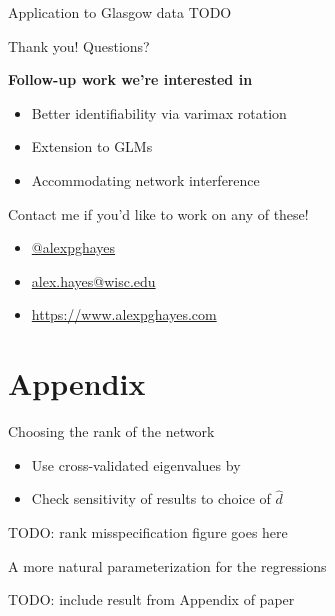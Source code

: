 \documentclass{beamer}
\theoremstyle{remark}
\begin{document}
\begin{frame}{Application to Glasgow data}
    TODO
\end{frame}

\begin{frame}{Thank you! Questions?}

    \textbf{Follow-up work we're interested in}

    \begin{itemize}
        \item Better identifiability via varimax rotation
        \item Extension to GLMs
        \item Accommodating network interference
    \end{itemize}

    Contact me if you'd like to work on any of these!

    \begin{itemize}
        \item[]  \href{https://twitter.com/alexpghayes}{@alexpghayes}
        \item[]  \href{mailto:alex.hayes@wisc.edu}{alex.hayes@wisc.edu}
        \item[]  \url{https://www.alexpghayes.com}
    \end{itemize}

\end{frame}


\section{Appendix}

\begin{frame}{Choosing the rank of the network}

    \begin{itemize}
        \item Use cross-validated eigenvalues by \cite{chen_estimating_2021}
        \item Check sensitivity of results to choice of $\widehat{d}$
    \end{itemize}

    TODO: rank misspecification figure goes here

\end{frame}

\begin{frame}{A more natural parameterization for the regressions}

    TODO: include result from Appendix of paper

\end{frame}
\end{document}
